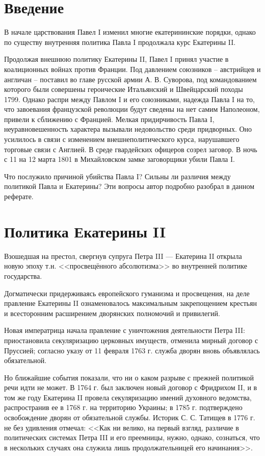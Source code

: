 \documentclass[a4paper,12pt]{diss_4}
\begin{document}

\addtocounter{page}{1}

\tableofcontents

\chapter*{Введение}

В начале царствования Павел I изменил многие екатерининские порядки, однако по существу внутренняя политика Павла I продолжала курс Екатерины II. 

Продолжая внешнюю политику Екатерины II, Павел I принял участие в коалиционных войнах против Франции. Под давлением союзников -- австрийцев и англичан -- поставил во главе русской армии А. В. Суворова, под командованием которого были совершены героические Итальянский и Швейцарский походы 1799. Однако распри между Павлом I и его союзниками, надежда Павла I на то, что завоевания французской революции будут сведены на нет самим Наполеоном, привели к сближению с Францией. Мелкая придирчивость Павла I, неуравновешенность характера вызывали недовольство среди придворных. Оно усилилось в связи с изменением внешнеполитического курса, нарушавшего торговые связи с Англией. В среде гвардейских офицеров созрел заговор. В ночь с 11 на 12 марта 1801 в Михайловском замке заговорщики убили Павла I.

Что послужило причиной убийства Павла I? Сильны ли различия между политикой Павла и Екатерины? Эти вопросы автор подробно разобрал в данном реферате.

\chapter{Политика Екатерины II}

Взошедшая на престол, свергнув супруга Петра III --- Екатерина II открыла новую эпоху т.н. <<просвещённого абсолютизма>> во внутренней политике государства. 

Догматически придерживаясь европейского гуманизма и просвещения, на деле правление Екатерины II ознаменовалось максимальным закрепощением крестьян и всесторонним расширением дворянских полномочий и привилегий. 

Новая императрица начала правление с уничтожения деятельности Петра III: приостановила секуляризацию церковных имуществ, отменила мирный договор с Пруссией; согласно указу от 11 февраля 1763 г. служба дворян вновь объявлялась обязательной. 

Но ближайшие события показали, что ни о каком разрыве с прежней политикой речи идти не может. В 1764 г. был заключен новый договор с Фридрихом II, и в том же году Екатерина II провела секуляризацию имений духовного ведомства, распространив ее в 1768 г. на территорию Украины; в 1785 г. подтверждено освобождение дворян от обязательной службы. Историк С. С. Татищев в 1776 г. не без удивления отмечал: <<Как ни велико, на первый взгляд, различие в политических системах Петра III и его преемницы, нужно, однако, сознаться, что в нескольких случаях она служила лишь продолжательницей его начинания>>.
\end{document}
